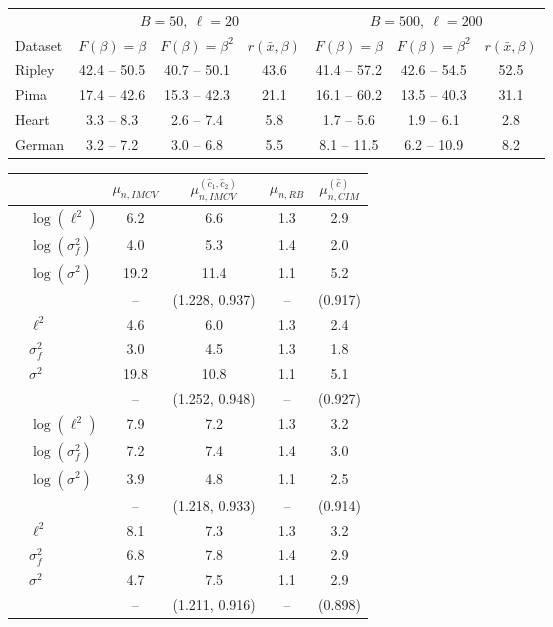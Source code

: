 \begin{tabular}{lcccccc}
\toprule
 & \multicolumn{3}{c}{$B=50,\ \ell=20$} & \multicolumn{3}{c}{$B=500,\ \ell=200$} \\
Dataset & $F(\beta)=\beta$ & $F(\beta)=\beta^2$ & $r(\bar{x},\beta)$ & $F(\beta)=\beta$ & $F(\beta)=\beta^2$ & $r(\bar{x},\beta)$ \\
\midrule
Ripley & 42.4 -- 50.5 & 40.7 -- 50.1 & 43.6 & 41.4 -- 57.2 & 42.6 -- 54.5 & 52.5 \\
Pima & 17.4 -- 42.6 & 15.3 -- 42.3 & 21.1 & 16.1 -- 60.2 & 13.5 -- 40.3 & 31.1 \\
Heart & 3.3 -- 8.3 & 2.6 -- 7.4 & 5.8 & 1.7 -- 5.6 & 1.9 -- 6.1 & 2.8 \\
German & 3.2 -- 7.2 & 3.0 -- 6.8 & 5.5 & 8.1 -- 11.5 & 6.2 -- 10.9 & 8.2 \\
\bottomrule
\end{tabular}

\begin{tabular}{llcccc}
\toprule
 & & $\mu_{n,IMCV}$ & $\mu^{(\hat c_1,\hat c_2)}_{n,IMCV}$ & $\mu_{n,RB}$ & $\mu^{(\hat c)}_{n,CIM}$ \\
\midrule
{} & $\log(\ell^2)$ & 6.2 & 6.6 & 1.3 & 2.9 \\
 & $\log(\sigma_f^2)$ & 4.0 & 5.3 & 1.4 & 2.0 \\
 & $\log(\sigma^2)$ & 19.2 & 11.4 & 1.1 & 5.2 \\
 & & -- & (1.228, 0.937) & -- & (0.917) \\
 & $\ell^2$ & 4.6 & 6.0 & 1.3 & 2.4 \\
 & $\sigma_f^2$ & 3.0 & 4.5 & 1.3 & 1.8 \\
 & $\sigma^2$ & 19.8 & 10.8 & 1.1 & 5.1 \\
 & & -- & (1.252, 0.948) & -- & (0.927) \\
\midrule
{} & $\log(\ell^2)$ & 7.9 & 7.2 & 1.3 & 3.2 \\
 & $\log(\sigma_f^2)$ & 7.2 & 7.4 & 1.4 & 3.0 \\
 & $\log(\sigma^2)$ & 3.9 & 4.8 & 1.1 & 2.5 \\
 & & -- & (1.218, 0.933) & -- & (0.914) \\
 & $\ell^2$ & 8.1 & 7.3 & 1.3 & 3.2 \\
 & $\sigma_f^2$ & 6.8 & 7.8 & 1.4 & 2.9 \\
 & $\sigma^2$ & 4.7 & 7.5 & 1.1 & 2.9 \\
 & & -- & (1.211, 0.916) & -- & (0.898) \\
\bottomrule
\end{tabular}
